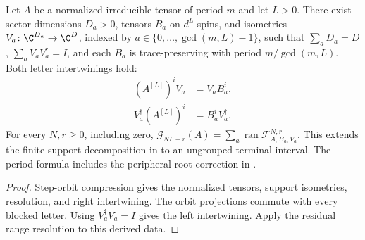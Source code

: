 \begin{lemma}
    \label{thm:periodic_residual_ground_space}
    \leanok
    Let $A$ be a normalized irreducible tensor of period $m$ and let $L>0$.
    There exist sector dimensions $D_a>0$, tensors $B_a$ on $d^L$ spins,
    and isometries $V_a\colon\C^{D_a}\to\C^D$, indexed by
    $a\in\{0,\ldots,\gcd(m,L)-1\}$, such that $\sum_aD_a=D$,
    $\sum_aV_aV_a^\dagger=I$, and each $B_a$ is trace-preserving with
    period $m/\gcd(m,L)$. Both letter intertwinings hold:
    \begin{align}
        (A^{[L]})^iV_a         & =V_aB_a^i,         \\
        V_a^\dagger(A^{[L]})^i & =B_a^iV_a^\dagger.
    \end{align}
    For every $N,r\geq0$, including zero,
    $\mathcal G_{NL+r}(A)=\sum_a\operatorname{ran}
        \mathcal F_{A,B_a,V_a}^{N,r}$.
    This extends the finite support decomposition in
    \cite[Lemma~\texttt{blocking-arbitrary}]{DeLasCuevas2017Irreducible}
    to an ungrouped terminal interval. The period formula includes the
    peripheral-root correction in
    \cite{gap:dccsp17_blocking_peripheral_roots}.
\end{lemma}
\begin{proof}\leanok
    Step-orbit compression gives the normalized tensors, support isometries,
    resolution, and right intertwining. The orbit projections commute
    with every blocked letter. Using $V_a^\dagger V_a=I$ gives the left
    intertwining. Apply the residual range resolution to this derived data.
\end{proof}

